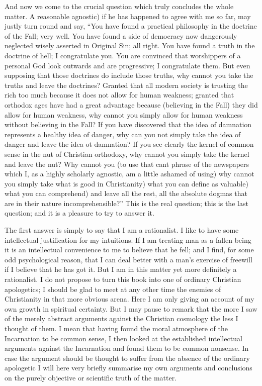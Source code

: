 \documentclass{book}
\begin{document}
And now we come to the crucial question which truly concludes the whole matter. A reasonable agnostic) if he has happened to agree with me so far, may justly turn round and say, “You have found a practical philosophy in the doctrine of the Fall; very well. You have found a side of democracy now dangerously neglected wisely asserted in Original Sin; all right. You have found a truth in the doctrine of hell; I congratulate you. You are convinced that worshippers of a personal God look outwards and are progressive; I congratulate them. But even supposing that those doctrines do include those truths, why cannot you take the truths and leave the doctrines? Granted that all modern society is trusting the rich too much because it does not allow for human weakness; granted that orthodox ages have had a great advantage because (believing in the Fall) they did allow for human weakness, why cannot you simply allow for human weakness without believing in the Fall? If you have discovered that the idea of damnation represents a healthy idea of danger, why can you not simply take the idea of danger and leave the idea ot damnation? If you see clearly the kernel of common-sense in the nut of Christian orthodoxy, why cannot you simply take the kernel and leave the nut? Why cannot you (to use that cant phrase of the newspapers which I, as a highly scholarly agnostic, am a little ashamed of using) why cannot you simply take what is good in Christianity) what you can define as valuable) what you can comprehend) and leave all the rest, all the absolute dogmas that are in their nature incomprehensible?” This is the real question; this is the last question; and it is a pleasure to try to answer it.

The first answer is simply to say that I am a rationalist. I like to have some intellectual justification for my intuitions. If I am treating man as a fallen being it is an intellectual convenience to me to believe that he fell; and I find, for some odd psychological reason, that I can deal better with a man’s exercise of freewill if I believe that he has got it. But I am in this matter yet more definitely a rationalist. I do not propose to turn this book into one of ordinary Christian apologetics; I should be glad to meet at any other time the enemies of Christianity in that more obvious arena. Here I am only giving an account of my own growth in spiritual certainty. But I may pause to remark that the more I saw of the merely abstract arguments against the Christian cosmology the less I thought of them. I mean that having found the moral atmosphere of the Incarnation to be common sense, I then looked at the established intellectual arguments against the Incarnation and found them to be common nonsense. In case the argument should be thought to suffer from the absence of the ordinary apologetic I will here very briefly summarise my own arguments and conclusions on the purely objective or scientific truth of the matter.
\end{document}
